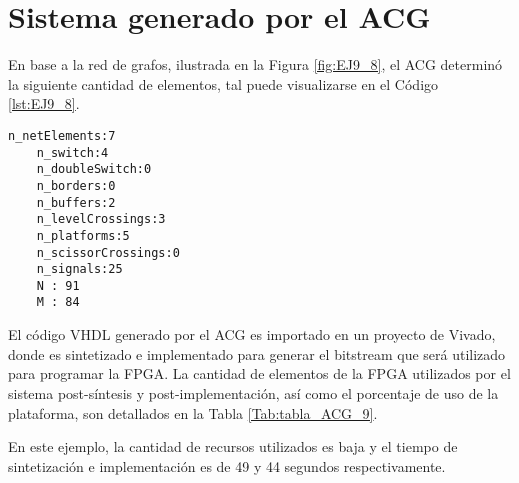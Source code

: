 \section{Sistema generado por el ACG}

	En base a la red de grafos, ilustrada en la Figura \ref{fig:EJ9_8}, el ACG determinó la siguiente cantidad de elementos, tal puede visualizarse en el Código \ref{lst:EJ9_8}.
	
	\begin{lstlisting}[language = {}, caption = Cantidad de elementos a implementar por el ACG, label = {lst:EJ9_8}]
	n_netElements:7
	n_switch:4
	n_doubleSwitch:0
	n_borders:0
	n_buffers:2
	n_levelCrossings:3
	n_platforms:5
	n_scissorCrossings:0
	n_signals:25
	N : 91
	M : 84
	\end{lstlisting}
	
	El código VHDL generado por el ACG es importado en un proyecto de Vivado, donde es sintetizado e implementado para generar el bitstream que será utilizado para programar la FPGA. La cantidad de elementos de la FPGA utilizados por el sistema post-síntesis y post-implementación, así como el porcentaje de uso de la plataforma, son detallados en la Tabla \ref{Tab:tabla_ACG_9}.
	
	\begin{table}[H]
		{
			\caption{Síntesis e implementación del ejemplo 9 generado por el ACG.}
			\label{Tab:tabla_ACG_9}
			\centering
			\begin{center}
			\end{center}
		}    
	\end{table}
	
	En este ejemplo, la cantidad de recursos utilizados es baja y el tiempo de sintetización e implementación es de 49 y 44 segundos respectivamente.